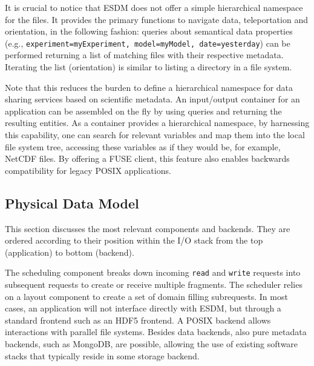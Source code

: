 It is crucial to notice that ESDM does not offer a simple hierarchical namespace for the files.
It provides the primary functions to navigate data, teleportation and orientation, in the following fashion:
queries about semantical data properties (e.g., \texttt{experiment=myExperiment, model=myModel, date=yesterday}) can be performed returning a list of matching files with their respective metadata.
Iterating the list (orientation) is similar to listing a directory in a file system.

Note that this reduces the burden to define a hierarchical namespace for data sharing services based on scientific metadata.
An input/output container for an application can be assembled on the fly by using queries and returning the resulting entities.
As a container provides a hierarchical namespace,
by harnessing this capability, one can search for relevant variables and map them into the local file system tree, accessing these variables as if they would be, for example, NetCDF files.
By offering a FUSE client, this feature also enables backwards compatibility for legacy POSIX applications.

\subsection{Physical Data Model}
\label{chap:components and backends}

\tab
This section discusses the most relevant components and backends.
They are ordered according to their position within the I/O stack from the top (application)
to bottom (backend).

The scheduling component breaks down incoming \texttt{read} and \texttt{write} requests into subsequent requests to create or receive multiple fragments. The scheduler relies on a layout component to create a set of domain filling subrequests.
In most cases, an application will not interface directly with ESDM,
but through a standard frontend such as an HDF5 frontend.
A POSIX backend allows interactions with parallel file systems.
Besides data backends, also pure
metadata backends, such as MongoDB, are possible, allowing the use of existing software stacks that typically
reside in some storage backend.


